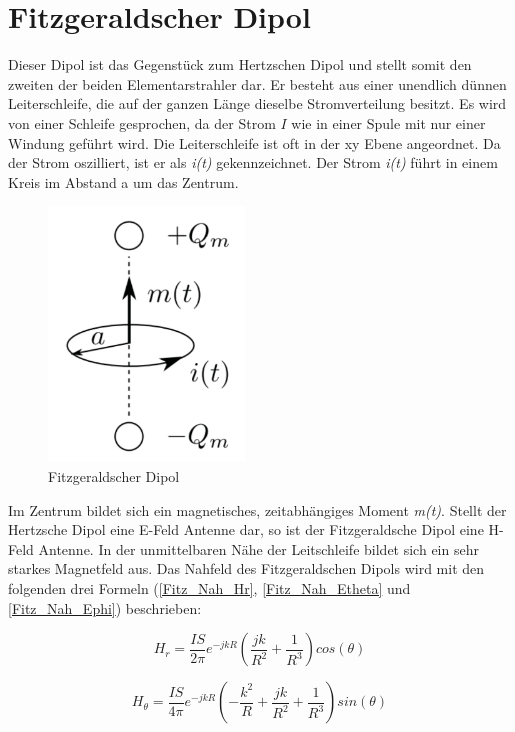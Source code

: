 \section{Fitzgeraldscher Dipol }\label{sec:FitzgeraldescherDipol}
Dieser Dipol ist das Gegenstück zum Hertzschen Dipol und stellt somit den zweiten der beiden Elementarstrahler dar. Er besteht aus einer unendlich dünnen Leiterschleife, die auf der ganzen Länge dieselbe Stromverteilung besitzt. Es wird von einer Schleife gesprochen, da der Strom $I$ wie in einer Spule mit nur einer Windung geführt wird. Die Leiterschleife ist oft in der xy Ebene angeordnet. Da der Strom oszilliert, ist er als \textit{i(t)} gekennzeichnet. Der Strom \textit{i(t)} führt in einem Kreis im Abstand a um das Zentrum.
\begin{figure}[!h]
	\centering
	\includegraphics[width=5.2cm]{content/bilder/Fitzgerald_Dipol_EMANT_S37.pdf}%
	\caption{Fitzgeraldscher Dipol \cite{Emant}}
	\label{FitzDipol_elementar_Loop}
\end{figure}
\newpage 
Im Zentrum bildet sich ein magnetisches, zeitabhängiges Moment \textit{m(t)}. Stellt der Hertzsche Dipol eine E-Feld Antenne dar, so ist der Fitzgeraldsche Dipol eine H-Feld Antenne. In der unmittelbaren Nähe der Leitschleife bildet sich ein sehr starkes Magnetfeld aus. Das Nahfeld des Fitzgeraldschen Dipols wird mit den folgenden drei Formeln (\ref{Fitz_Nah_Hr}, \ref{Fitz_Nah_Etheta} und \ref{Fitz_Nah_Ephi}) beschrieben\cite{elliott1981antenna}:


\begin{equation}
H_r= \frac{I S}{2\pi}   e^{-jkR} \left( \frac{jk}{R^{2}}  + \frac{1}{R^{3}} \right) cos(\theta)
\label{Fitz_Nah_Hr}
\end{equation}

\begin{equation}
H_\theta= \frac{I S}{4\pi}   e^{-jkR} \left(- \frac{k^{2}}{R}  + \frac{jk}{R^{2}}+ \frac{1}{R^{3}} \right) sin(\theta)
\label{Fitz_Nah_Etheta}
\end{equation}

